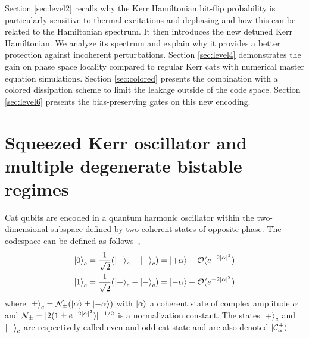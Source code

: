 \documentclass[%
 reprint,
 superscriptaddress,
 amsmath,
 amssymb,
 aps,
 pra,
 10pt
]{revtex4-2}
\begin{document}
Section \ref{sec:level2} recalls why the Kerr Hamiltonian bit-flip probability is particularly sensitive to thermal excitations and dephasing and how this can be related to the Hamiltonian spectrum. It then introduces the new detuned Kerr Hamiltonian. We analyze its spectrum and explain why it provides a better protection against incoherent perturbations. Section \ref{sec:level4} demonstrates the gain on phase space locality compared to regular Kerr cats with numerical master equation simulations. Section \ref{sec:colored} presents the combination with a colored dissipation scheme to limit the leakage outside of the code space. Section \ref{sec:level6} presents the bias-preserving gates on this new encoding.

\section{\label{sec:level2}Squeezed Kerr oscillator and multiple degenerate bistable regimes}

Cat qubits are encoded in a quantum harmonic oscillator within the two-dimensional subspace defined by two coherent states of opposite phase. The codespace can be defined as follows~\cite{Cochrane1999,Mirrahimi2014},
\begin{equation}
    \begin{split}
        \ket{0}_c=\frac{1}{\sqrt{2}}(\ket{+}_c+\ket{-}_c) = \ket{+\alpha}+\mathcal{O} (e^{-2\abs{\alpha}^2}) \\
        \ket{1}_c=\frac{1}{\sqrt{2}}(\ket{+}_c-\ket{-}_c) = \ket{-\alpha}+\mathcal{O}(e^{-2\abs{\alpha}^2})
        \label{eq:CatEncoding}
    \end{split}
\end{equation}
where $\ket{\pm}_c=\mathcal{N}_{\pm}(\ket{\alpha}\pm\ket{-\alpha})$ with $\ket{\alpha}$ a coherent state of complex amplitude $\alpha$ and $\mathcal{N}_{\pm}=[2 (1\pm e^{-2 \abs{\alpha}^2})]^{-1/2}$ is a normalization constant. The states $\ket{+}_c$ and $\ket{-}_c$ are respectively called even and odd cat state and are also denoted $\ket{\mathcal{C_\alpha^\pm}}$.
\end{document}
